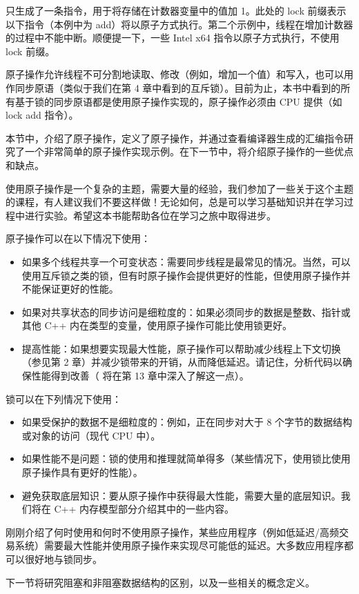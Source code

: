 只生成了一条指令，用于将存储在计数器变量中的值加 1。此处的 lock 前缀表示以下指令（本例中为 add）将以原子方式执行。第二个示例中，线程在增加计数器的过程中不能中断。顺便提一下，一些 Intel x64 指令以原子方式执行，不使用 lock 前缀。

原子操作允许线程不可分割地读取、修改（例如，增加一个值）和写入，也可以用作同步原语（类似于我们在第 4 章中看到的互斥锁）。目前为止，本书中看到的所有基于锁的同步原语都是使用原子操作实现的，原子操作必须由 CPU 提供（如 lock add 指令）。

本节中，介绍了原子操作，定义了原子操作，并通过查看编译器生成的汇编指令研究了一个非常简单的原子操作实现示例。在下一节中，将介绍原子操作的一些优点和缺点。


使用原子操作是一个复杂的主题，需要大量的经验，我们参加了一些关于这个主题的课程，有人建议我们不要这样做！无论如何，总是可以学习基础知识并在学习过程中进行实验。希望这本书能帮助各位在学习之旅中取得进步。

原子操作可以在以下情况下使用：

\begin{itemize}
\item
如果多个线程共享一个可变状态：需要同步线程是最常见的情况。当然，可以使用互斥锁之类的锁，但有时原子操作会提供更好的性能，但使用原子操作并不能保证更好的性能。

\item
如果对共享状态的同步访问是细粒度的：如果必须同步的数据是整数、指针或其他 C++ 内在类型的变量，使用原子操作可能比使用锁更好。

\item
提高性能：如果想要实现最大性能，原子操作可以帮助减少线程上下文切换（参见第 2 章）并减少锁带来的开销，从而降低延迟。请记住，分析代码以确保性能得到改善（ 将在第 13 章中深入了解这一点）。
\end{itemize}

锁可以在下列情况下使用：

\begin{itemize}
\item
如果受保护的数据不是细粒度的：例如，正在同步对大于 8 个字节的数据结构或对象的访问（现代 CPU 中）。

\item
如果性能不是问题：锁的使用和推理就简单得多（某些情况下，使用锁比使用原子操作具有更好的性能）。

\item
避免获取底层知识：要从原子操作中获得最大性能，需要大量的底层知识。我们将在 C++ 内存模型部分介绍其中的一些内容。
\end{itemize}

刚刚介绍了何时使用和何时不使用原子操作，某些应用程序（例如低延迟/高频交易系统）需要最大性能并使用原子操作来实现尽可能低的延迟。大多数应用程序都可以很好地与锁同步。

下一节将研究阻塞和非阻塞数据结构的区别，以及一些相关的概念定义。








